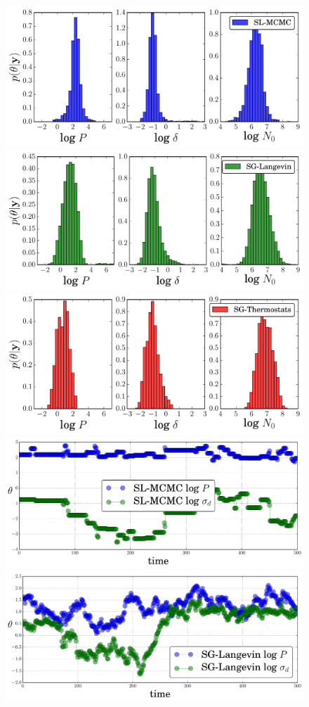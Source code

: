 \documentclass[]{article}
\begin{document}
  
  \begin{figure}[ht!]
  \setlength{\linewidth}{\textwidth}
  \setlength{\hsize}{\textwidth}
  \begin{center}
    \includegraphics[width=0.65\columnwidth]{./images/blowfly/non-sticky-theta-hist-SL-MCMC.pdf}
    \includegraphics[width=0.65\columnwidth]{./images/blowfly/non-sticky-theta-hist-SG-Langevin.pdf}
    \includegraphics[width=0.65\columnwidth]{./images/blowfly/non-sticky-theta-hist-SG-Thermostats.pdf}
    \includegraphics[width=0.65\columnwidth]{./images/blowfly/non-sticky-theta-1d-SL-MCMC.pdf}
    \includegraphics[width=0.65\columnwidth]{./images/blowfly/non-sticky-theta-1d-SG-Langevin.pdf}

\end{center}
\end{figure}
\end{document}
